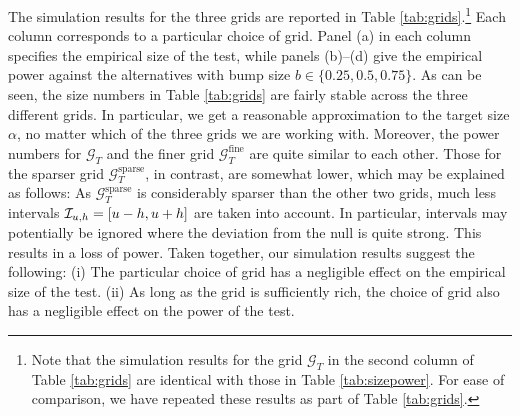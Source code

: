 \documentclass[12pt]{article}
\begin{document}
The simulation results for the three grids are reported in Table \ref{tab:grids}.\footnote{Note that the simulation results for the grid $\mathcal{G}_T$ in the second column of Table \ref{tab:grids} are identical with those in Table \ref{tab:sizepower}. For ease of comparison, we have repeated these results as part of Table \ref{tab:grids}.}
Each column corresponds to a particular choice of grid. Panel (a) in each column specifies the empirical size of the test, while panels (b)--(d) give the empirical power against the alternatives with bump size $b \in \{0.25,0.5,0.75\}$. 
As can be seen, the size numbers in Table \ref{tab:grids} are fairly stable across the three different grids. In particular, we get a reasonable approximation to the target size $\alpha$, no matter which of the three grids we are working with. Moreover, the power numbers for $\mathcal{G}_T$ and the finer grid $\mathcal{G}_T^{\text{fine}}$ are quite similar to each other. Those for the sparser grid $\mathcal{G}_T^{\text{sparse}}$, in contrast, are somewhat lower, which may be explained as follows: As $\mathcal{G}_T^{\text{sparse}}$ is considerably sparser than the other two grids, much less intervals $\mathcal{I}_{u, h} = [u-h,u+h]$ are taken into account. In particular, intervals may potentially be ignored where the deviation from the null is quite strong. This results in a loss of power.
Taken together, our simulation results suggest the following: (i) The particular choice of grid has a negligible effect on the empirical size of the test. (ii) As long as the grid is sufficiently rich, the choice of grid also has a negligible effect on the power of the test. 
\end{document}
